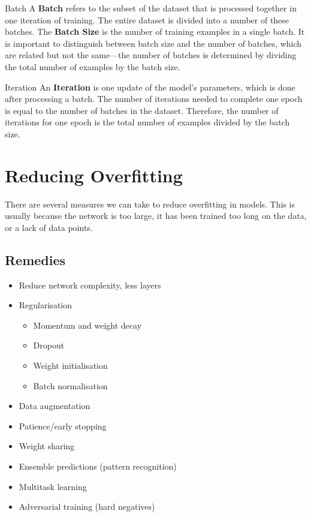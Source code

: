 \begin{definitionbox}{Batch}
A \textbf{Batch} refers to the subset of the dataset that is processed together in one iteration of training. The entire dataset is divided into a number of these batches. The \textbf{Batch Size} is the number of training examples in a single batch. It is important to distinguish between batch size and the number of batches, which are related but not the same—the number of batches is determined by dividing the total number of examples by the batch size.
\end{definitionbox}

\begin{definitionbox}{Iteration}
An \textbf{Iteration} is one update of the model's parameters, which is done after processing a batch. The number of iterations needed to complete one epoch is equal to the number of batches in the dataset. Therefore, the number of iterations for one epoch is the total number of examples divided by the batch size.
\end{definitionbox}

\section{Reducing Overfitting}

There are several measures we can take to reduce overfitting in models. This is usually because the network is too large, it has been trained too long on the data, or a lack of data points.

\subsection*{Remedies}
\begin{itemize}
    \item Reduce network complexity, less layers
    \item Regularisation 
        \begin{itemize}
            \item Momentum and weight decay
            \item Dropout
            \item Weight initialisation
            \item Batch normalisation
        \end{itemize}
    \item Data augmentation
    \item Patience/early stopping
    \item Weight sharing
    \item Ensemble predictions (pattern recognition)
    \item Multitask learning
    \item Adversarial training (hard negatives)
\end{itemize}

